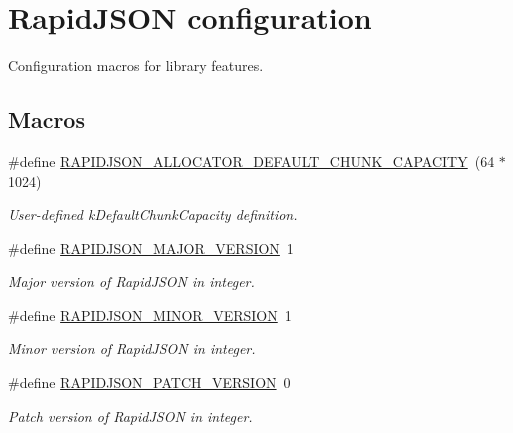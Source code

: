 \hypertarget{group___r_a_p_i_d_j_s_o_n___c_o_n_f_i_g}{}\section{Rapid\+J\+S\+ON configuration}
\label{group___r_a_p_i_d_j_s_o_n___c_o_n_f_i_g}


Configuration macros for library features.  


\subsection*{Macros}
\begin{DoxyCompactItemize}
\item 
\#define \mbox{\hyperlink{group___r_a_p_i_d_j_s_o_n___c_o_n_f_i_g_ga860570d04d489be08b9835d2ec58bac5}{R\+A\+P\+I\+D\+J\+S\+O\+N\+\_\+\+A\+L\+L\+O\+C\+A\+T\+O\+R\+\_\+\+D\+E\+F\+A\+U\+L\+T\+\_\+\+C\+H\+U\+N\+K\+\_\+\+C\+A\+P\+A\+C\+I\+TY}}~(64 $\ast$ 1024)
\begin{DoxyCompactList}\small\item\em User-\/defined k\+Default\+Chunk\+Capacity definition. \end{DoxyCompactList}\item 
\#define \mbox{\hyperlink{group___r_a_p_i_d_j_s_o_n___c_o_n_f_i_g_gaf1ff1685be6cbebb5d4b2ab997776f45}{R\+A\+P\+I\+D\+J\+S\+O\+N\+\_\+\+M\+A\+J\+O\+R\+\_\+\+V\+E\+R\+S\+I\+ON}}~1
\begin{DoxyCompactList}\small\item\em Major version of Rapid\+J\+S\+ON in integer. \end{DoxyCompactList}\item 
\#define \mbox{\hyperlink{group___r_a_p_i_d_j_s_o_n___c_o_n_f_i_g_gaf9125105c593a636a79f1c2d96835376}{R\+A\+P\+I\+D\+J\+S\+O\+N\+\_\+\+M\+I\+N\+O\+R\+\_\+\+V\+E\+R\+S\+I\+ON}}~1
\begin{DoxyCompactList}\small\item\em Minor version of Rapid\+J\+S\+ON in integer. \end{DoxyCompactList}\item 
\#define \mbox{\hyperlink{group___r_a_p_i_d_j_s_o_n___c_o_n_f_i_g_gaf967d31be43666ce7f53756d73bd1cdf}{R\+A\+P\+I\+D\+J\+S\+O\+N\+\_\+\+P\+A\+T\+C\+H\+\_\+\+V\+E\+R\+S\+I\+ON}}~0
\begin{DoxyCompactList}\small\item\em Patch version of Rapid\+J\+S\+ON in integer. \end{DoxyCompactList}\item 

\end{DoxyCompactItemize}
